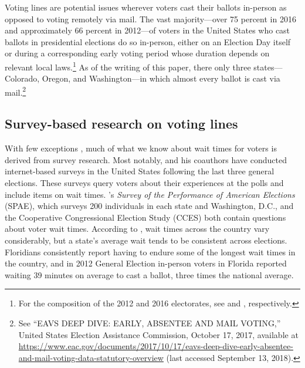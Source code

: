 \documentclass[12pt,titlepage]{article}
\begin{document}
Voting lines are potential issues wherever voters cast their ballots
in-person as opposed to voting remotely via mail.  The vast
majority---over 75 percent in 2016 and approximately 66 percent in
2012---of voters in the United States who cast ballots in presidential
elections do so in-person, either on an Election Day itself or during
a corresponding early voting period whose duration depends on relevant
local laws.\footnote{For the composition of the 2012 and 2016
  electorates, see \citet{eac:2012} and \citet{eac:2016},
  respectively.}  As of the writing of this paper, there only three
states---Colorado, Oregon, and Washington---in which almost every
ballot is cast via mail.\footnote{See ``EAVS DEEP DIVE: EARLY,
  ABSENTEE AND MAIL VOTING,'' United States Election Assistance
  Commission, October 17, 2017, available at
  \url{https://www.eac.gov/documents/2017/10/17/eavs-deep-dive-early-absentee-and-mail-voting-data-statutory-overview}
  (last accessed September 13, 2018).}


\subsection*{Survey-based research on voting lines}


With few exceptions \citep[e.g.,][]{spencermarkovits:renege,
  herronsmith:hanoverstudy, pettigrew:longlinesminorityprecincts},
much of what we know about wait times for voters is derived from
survey research.  Most notably, \citet{stewart:waitingtovote2012} and
his coauthors have conducted internet-based surveys in the United
States following the last three general elections.  These surveys
query voters about their experiences at the polls and include items on
wait times.  \citeauthor{stewart:waitingtovote2012}'s \emph{Survey of
  the Performance of American Elections} (SPAE), which surveys 200
individuals in each state and Washington, D.C., and the Cooperative
Congressional Election Study (CCES) both contain questions about voter
wait times. According to \citeauthor{stewart:waitingtovote2012}, wait
times across the country vary considerably, but a state's average wait
tends to be consistent across elections. Floridians consistently
report having to endure some of the longest wait times in the country,
and in 2012 General Election in-person voters in Florida reported
waiting 39 minutes on average to cast a ballot, three times the
national average.
\end{document}

